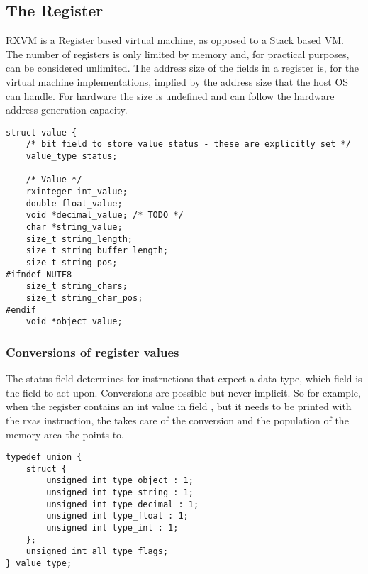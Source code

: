 
\subsection{The Register}
RXVM is a Register based virtual machine, as opposed to a Stack based
VM. The number of registers is only limited by memory and, for
practical purposes, can be considered unlimited. The address size of
the fields in a register is, for the virtual machine implementations,
implied by the address size that the host OS can handle. For hardware
the size is undefined and can follow the hardware address generation
capacity.

\begin{lstlisting}[style=embed,label=crexxregister,caption={The
\crexx{} Register implementation in C}]
struct value {
    /* bit field to store value status - these are explicitly set */
    value_type status;

    /* Value */
    rxinteger int_value;
    double float_value;
    void *decimal_value; /* TODO */
    char *string_value;
    size_t string_length;
    size_t string_buffer_length;
    size_t string_pos;
#ifndef NUTF8
    size_t string_chars;
    size_t string_char_pos;
#endif
    void *object_value;
\end{lstlisting}

\subsubsection{Conversions of register values}
The status field determines for instructions that expect a data type,
which field is the field to act upon. Conversions are possible but
never implicit. So for example, when the register contains an int
value in field , but it needs to be printed with the rxas
 instruction, the
 takes care of the conversion and the population of the
memory area the  points to. 

\begin{lstlisting}[style=embed,label=crexxregister,caption={Values of
the Status field}]
typedef union {
    struct {
        unsigned int type_object : 1;
        unsigned int type_string : 1;
        unsigned int type_decimal : 1;
        unsigned int type_float : 1;
        unsigned int type_int : 1;
    };
    unsigned int all_type_flags;
} value_type;
\end{lstlisting}

